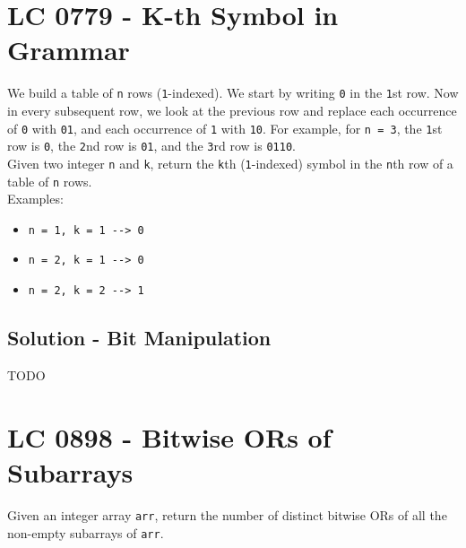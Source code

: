 \section{LC 0779 - K-th Symbol in Grammar}
We build a table of {\colorbox{CodeBackground}{\lstinline|n|}} rows ({\colorbox{CodeBackground}{\lstinline|1|}}-indexed). We start by writing {\colorbox{CodeBackground}{\lstinline|0|}} in the {\colorbox{CodeBackground}{\lstinline|1|}}st row. Now in every subsequent row, we look at the previous row and replace each occurrence of {\colorbox{CodeBackground}{\lstinline|0|}} with {\colorbox{CodeBackground}{\lstinline|01|}}, and each occurrence of {\colorbox{CodeBackground}{\lstinline|1|}} with {\colorbox{CodeBackground}{\lstinline|10|}}. For example, for {\colorbox{CodeBackground}{\lstinline|n = 3|}}, the {\colorbox{CodeBackground}{\lstinline|1|}}st row is {\colorbox{CodeBackground}{\lstinline|0|}}, the {\colorbox{CodeBackground}{\lstinline|2|}}nd row is {\colorbox{CodeBackground}{\lstinline|01|}}, and the {\colorbox{CodeBackground}{\lstinline|3|}}rd row is {\colorbox{CodeBackground}{\lstinline|0110|}}.\\

Given two integer {\colorbox{CodeBackground}{\lstinline|n|}} and {\colorbox{CodeBackground}{\lstinline|k|}}, return the {\colorbox{CodeBackground}{\lstinline|k|}}th ({\colorbox{CodeBackground}{\lstinline|1|}}-indexed) symbol in the {\colorbox{CodeBackground}{\lstinline|n|}}th row of a table of {\colorbox{CodeBackground}{\lstinline|n|}} rows.\\

Examples:
\begin{itemize}
\item {\colorbox{CodeBackground}{\lstinline|n = 1, k = 1 --> 0|}}
\item {\colorbox{CodeBackground}{\lstinline|n = 2, k = 1 --> 0|}}
\item {\colorbox{CodeBackground}{\lstinline|n = 2, k = 2 --> 1|}}
\end{itemize}

\subsection*{Solution - Bit Manipulation}
TODO

\section{LC 0898 - Bitwise ORs of Subarrays}
Given an integer array {\colorbox{CodeBackground}{\lstinline|arr|}}, return the number of distinct bitwise ORs of all the non-empty subarrays of {\colorbox{CodeBackground}{\lstinline|arr|}}.\\


